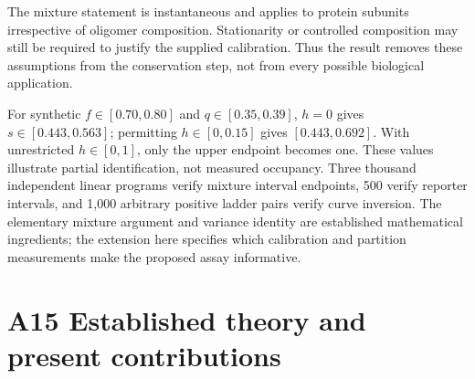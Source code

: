\documentclass[11pt]{article}
\begin{document}
The mixture statement is instantaneous and applies to protein subunits irrespective of oligomer composition. Stationarity or controlled composition may still be required to justify the supplied calibration. Thus the result removes these assumptions from the conservation step, not from every possible biological application.

For synthetic $f\in[0.70,0.80]$ and $q\in[0.35,0.39]$, $h=0$ gives $s\in[0.443,0.563]$; permitting $h\in[0,0.15]$ gives $[0.443,0.692]$. With unrestricted $h\in[0,1]$, only the upper endpoint becomes one. These values illustrate partial identification, not measured occupancy. Three thousand independent linear programs verify mixture interval endpoints, 500 verify reporter intervals, and 1,000 arbitrary positive ladder pairs verify curve inversion. The elementary mixture argument and variance identity are established mathematical ingredients; the extension here specifies which calibration and partition measurements make the proposed assay informative.

\section*{A15 Established theory and present contributions}
\end{document}
